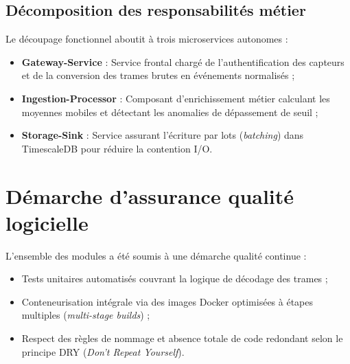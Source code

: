 \subsection{D\'ecomposition des responsabilit\'es m\'etier}
Le d\'ecoupage fonctionnel aboutit \`a trois microservices autonomes :
\begin{itemize}
    \item \textbf{Gateway-Service} : Service frontal charg\'e de l'authentification des capteurs et de la conversion des trames brutes en \'ev\'enements normalis\'es ;
    \item \textbf{Ingestion-Processor} : Composant d'enrichissement m\'etier calculant les moyennes mobiles et d\'etectant les anomalies de d\'epassement de seuil ;
    \item \textbf{Storage-Sink} : Service assurant l'\'ecriture par lots (\textit{batching}) dans TimescaleDB pour r\'eduire la contention I/O.
\end{itemize}

\section{D\'emarche d'assurance qualit\'e logicielle}
L'ensemble des modules a \'et\'e soumis \`a une d\'emarche qualit\'e continue :
\begin{itemize}
    \item Tests unitaires automatis\'es couvrant la logique de d\'ecodage des trames ;
    \item Conteneurisation int\'egrale via des images Docker optimis\'ees \`a \'etapes multiples (\textit{multi-stage builds}) ;
    \item Respect des r\`egles de nommage et absence totale de code redondant selon le principe DRY (\textit{Don't Repeat Yourself}).
\end{itemize}

